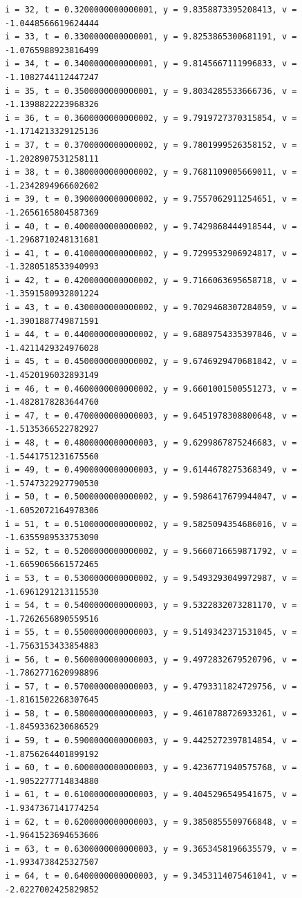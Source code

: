 \documentclass[a4j,titlepage]{jsarticle}
\begin{document}
\begin{lstlisting}[style=text,caption=課題8の実行結果,label=lst:kekka8]
i = 32, t = 0.3200000000000001, y = 9.8358873395208413, v = -1.0448566619624444
i = 33, t = 0.3300000000000001, y = 9.8253865300681191, v = -1.0765988923816499
i = 34, t = 0.3400000000000001, y = 9.8145667111996833, v = -1.1082744112447247
i = 35, t = 0.3500000000000001, y = 9.8034285533666736, v = -1.1398822223968326
i = 36, t = 0.3600000000000002, y = 9.7919727370315854, v = -1.1714213329125136
i = 37, t = 0.3700000000000002, y = 9.7801999526358152, v = -1.2028907531258111
i = 38, t = 0.3800000000000002, y = 9.7681109005669011, v = -1.2342894966602602
i = 39, t = 0.3900000000000002, y = 9.7557062911254651, v = -1.2656165804587369
i = 40, t = 0.4000000000000002, y = 9.7429868444918544, v = -1.2968710248131681
i = 41, t = 0.4100000000000002, y = 9.7299532906924817, v = -1.3280518533940993
i = 42, t = 0.4200000000000002, y = 9.7166063695658718, v = -1.3591580932801224
i = 43, t = 0.4300000000000002, y = 9.7029468307284059, v = -1.3901887749871591
i = 44, t = 0.4400000000000002, y = 9.6889754335397846, v = -1.4211429324976028
i = 45, t = 0.4500000000000002, y = 9.6746929470681842, v = -1.4520196032893149
i = 46, t = 0.4600000000000002, y = 9.6601001500551273, v = -1.4828178283644760
i = 47, t = 0.4700000000000003, y = 9.6451978308800648, v = -1.5135366522782927
i = 48, t = 0.4800000000000003, y = 9.6299867875246683, v = -1.5441751231675560
i = 49, t = 0.4900000000000003, y = 9.6144678275368349, v = -1.5747322927790530
i = 50, t = 0.5000000000000002, y = 9.5986417679944047, v = -1.6052072164978306
i = 51, t = 0.5100000000000002, y = 9.5825094354686016, v = -1.6355989533753090
i = 52, t = 0.5200000000000002, y = 9.5660716659871792, v = -1.6659065661572465
i = 53, t = 0.5300000000000002, y = 9.5493293049972987, v = -1.6961291213115530
i = 54, t = 0.5400000000000003, y = 9.5322832073281170, v = -1.7262656890559516
i = 55, t = 0.5500000000000003, y = 9.5149342371531045, v = -1.7563153433854883
i = 56, t = 0.5600000000000003, y = 9.4972832679520796, v = -1.7862771620998896
i = 57, t = 0.5700000000000003, y = 9.4793311824729756, v = -1.8161502268307645
i = 58, t = 0.5800000000000003, y = 9.4610788726933261, v = -1.8459336230686529
i = 59, t = 0.5900000000000003, y = 9.4425272397814854, v = -1.8756264401899192
i = 60, t = 0.6000000000000003, y = 9.4236771940575768, v = -1.9052277714834880
i = 61, t = 0.6100000000000003, y = 9.4045296549541675, v = -1.9347367141774254
i = 62, t = 0.6200000000000003, y = 9.3850855509766848, v = -1.9641523694653606
i = 63, t = 0.6300000000000003, y = 9.3653458196635579, v = -1.9934738425327507
i = 64, t = 0.6400000000000003, y = 9.3453114075461041, v = -2.0227002425829852

\end{lstlisting}
\end{document}

